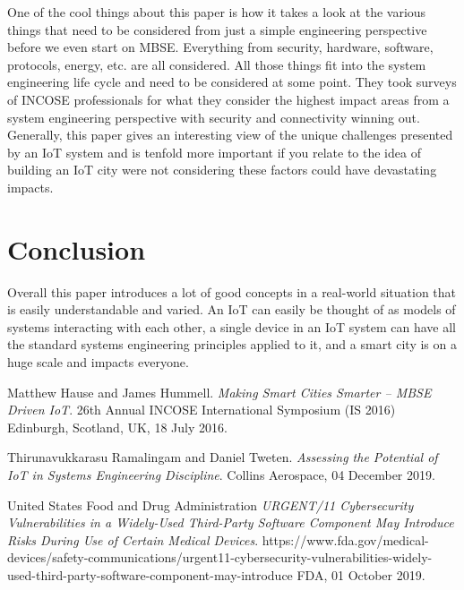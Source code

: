 \documentclass[11pt]{asme2ej}
\begin{document}
One of the cool things about this paper is how it takes a look at the various things that need to be considered from just a simple engineering perspective before we even start on MBSE. Everything from security, hardware, software, protocols, energy, etc. are all considered.
All those things fit into the system engineering life cycle and need to be considered at some point.
They took surveys of INCOSE professionals for what they consider the highest impact areas from a system engineering perspective with security and connectivity winning out.
Generally, this paper gives an interesting view of the unique challenges presented by an IoT system and is tenfold more important if you relate to the idea of building an IoT city were not considering these factors could have devastating impacts.

\section{Conclusion}

Overall this paper introduces a lot of good concepts in a real-world situation that is easily understandable and varied. 
An IoT can easily be thought of as models of systems interacting with each other, a single device in an IoT system can have all the standard systems engineering principles applied to it, and a smart city is on a huge scale and impacts everyone.

\begin{thebibliography}{1}

    Matthew Hause and James Hummell. 
    \textit{Making Smart Cities Smarter – MBSE Driven IoT}. 
    26th Annual INCOSE International Symposium (IS 2016) Edinburgh, Scotland, UK, 18 July 2016.

    Thirunavukkarasu Ramalingam and Daniel Tweten. 
    \textit{Assessing the Potential of IoT in Systems Engineering Discipline}. 
    Collins Aerospace, 04 December 2019.

    United States Food and Drug Administration
    \textit{URGENT/11 Cybersecurity Vulnerabilities in a Widely-Used Third-Party Software Component May Introduce Risks During Use of Certain Medical Devices}. 
    https://www.fda.gov/medical-devices/safety-communications/urgent11-cybersecurity-vulnerabilities-widely-used-third-party-software-component-may-introduce
    FDA, 01 October 2019.
    
\end{thebibliography}
\end{document}
